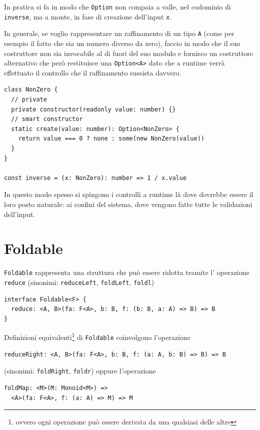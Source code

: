 \documentclass[12pt]{article}
\begin{document}
In pratica si fa in modo che \texttt{Option} non compaia a valle, nel codominio di \texttt{inverse},
ma a monte, in fase di creazione dell'input \texttt{x}.

In generale, se voglio rappresentare un raffinamento di un tipo \texttt{A} (come per esempio il fatto che sia un numero diverso da zero),
faccio in modo che il suo costruttore non sia invocabile al di fuori del suo modulo e fornisco un costruttore alternativo
che però restituisce una \texttt{Option<A>} dato che a runtime verrà effettuato il controllo che il raffinamento sussista davvero.

\begin{verbatim}
class NonZero {
  // private
  private constructor(readonly value: number) {}
  // smart constructor
  static create(value: number): Option<NonZero> {
    return value === 0 ? none : some(new NonZero(value))
  }
}

const inverse = (x: NonZero): number => 1 / x.value
\end{verbatim}

In questo modo spesso si spingono i controlli a runtime là dove dovrebbe essere il loro posto naturale: ai confini del sistema,
dove vengono fatte tutte le validazioni dell'input.

\newpage

\section{Foldable}

\texttt{Foldable} rappresenta una struttura che può essere ridotta tramite l' operazione \texttt{reduce}
(sinonimi: \texttt{reduceLeft}, \texttt{foldLeft}, \texttt{foldl})

\begin{verbatim}
interface Foldable<F> {
  reduce: <A, B>(fa: F<A>, b: B, f: (b: B, a: A) => B) => B
}
\end{verbatim}

Definizioni equivalenti\footnote{ovvero ogni operazione può essere derivata da una qualsiasi delle altre} di \texttt{Foldable}
coinvolgono l'operazione

\begin{verbatim}
reduceRight: <A, B>(fa: F<A>, b: B, f: (a: A, b: B) => B) => B
\end{verbatim}

(sinonimi: \texttt{foldRight}, \texttt{foldr}) oppure l'operazione

\begin{verbatim}
foldMap: <M>(M: Monoid<M>) =>
  <A>(fa: F<A>, f: (a: A) => M) => M
\end{verbatim}
\end{document}
